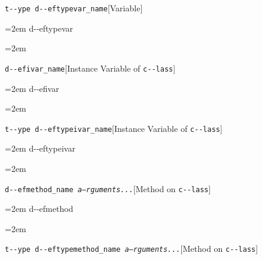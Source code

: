 \documentclass{book}
\begin{document}
\endgroup{}%
\noindent\texttt{t{-}{-}ype d{-}{-}eftypevar\_name}\hfill[Variable]



%
\par\begingroup\obeylines\obeyspaces\frenchspacing\leftskip=2em\relax\parskip=0pt\relax\ttfamily{}%
d{-}{-}eftypevar
\endgroup{}%
\par\begingroup\obeylines\obeyspaces\frenchspacing\leftskip=2em\relax\parskip=0pt\relax\ttfamily{}%

\endgroup{}%
\noindent\texttt{d{-}{-}efivar\_name}\hfill[Instance Variable of \texttt{c{-}{-}lass}]



%
\par\begingroup\obeylines\obeyspaces\frenchspacing\leftskip=2em\relax\parskip=0pt\relax\ttfamily{}%
d{-}{-}efivar
\endgroup{}%
\par\begingroup\obeylines\obeyspaces\frenchspacing\leftskip=2em\relax\parskip=0pt\relax\ttfamily{}%

\endgroup{}%
\noindent\texttt{t{-}{-}ype d{-}{-}eftypeivar\_name}\hfill[Instance Variable of \texttt{c{-}{-}lass}]



%
\par\begingroup\obeylines\obeyspaces\frenchspacing\leftskip=2em\relax\parskip=0pt\relax\ttfamily{}%
d{-}{-}eftypeivar
\endgroup{}%
\par\begingroup\obeylines\obeyspaces\frenchspacing\leftskip=2em\relax\parskip=0pt\relax\ttfamily{}%

\endgroup{}%
\noindent\texttt{d{-}{-}efmethod\_name \bgroup{}\normalfont{}\textsl{a--rguments...}\egroup{}}\hfill[Method on \texttt{c{-}{-}lass}]



%
\par\begingroup\obeylines\obeyspaces\frenchspacing\leftskip=2em\relax\parskip=0pt\relax\ttfamily{}%
d{-}{-}efmethod
\endgroup{}%
\par\begingroup\obeylines\obeyspaces\frenchspacing\leftskip=2em\relax\parskip=0pt\relax\ttfamily{}%

\endgroup{}%
\noindent\texttt{t{-}{-}ype d{-}{-}eftypemethod\_name \bgroup{}\normalfont{}\textsl{a--rguments...}\egroup{}}\hfill[Method on \texttt{c{-}{-}lass}]
\end{document}
